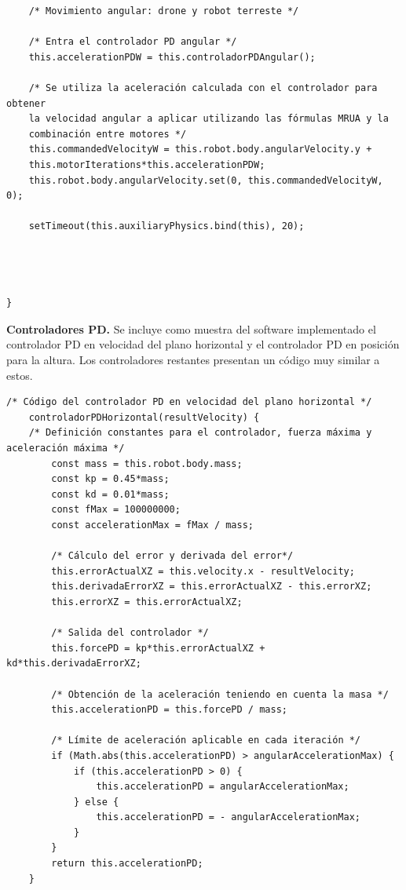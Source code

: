 {\begin{verbatim}
    /* Movimiento angular: drone y robot terreste */
    
    /* Entra el controlador PD angular */              
    this.accelerationPDW = this.controladorPDAngular();
    
    /* Se utiliza la aceleración calculada con el controlador para obtener 
    la velocidad angular a aplicar utilizando las fórmulas MRUA y la 
    combinación entre motores */
    this.commandedVelocityW = this.robot.body.angularVelocity.y + 
    this.motorIterations*this.accelerationPDW;
    this.robot.body.angularVelocity.set(0, this.commandedVelocityW, 0);
    
    setTimeout(this.auxiliaryPhysics.bind(this), 20);
    
    
    
    
}
\end{verbatim}
}
\normalsize
\textbf{Controladores PD.} Se incluye como muestra del software implementado el controlador PD en velocidad del plano horizontal y el controlador PD en posición para la altura. Los controladores restantes presentan un código muy similar a estos.

\footnotesize {
\begin{verbatim}
/* Código del controlador PD en velocidad del plano horizontal */
    controladorPDHorizontal(resultVelocity) {
    /* Definición constantes para el controlador, fuerza máxima y aceleración máxima */
        const mass = this.robot.body.mass;
        const kp = 0.45*mass;
        const kd = 0.01*mass;
        const fMax = 100000000;
        const accelerationMax = fMax / mass;

        /* Cálculo del error y derivada del error*/
        this.errorActualXZ = this.velocity.x - resultVelocity;
        this.derivadaErrorXZ = this.errorActualXZ - this.errorXZ;
        this.errorXZ = this.errorActualXZ;

        /* Salida del controlador */
        this.forcePD = kp*this.errorActualXZ + kd*this.derivadaErrorXZ;
        
        /* Obtención de la aceleración teniendo en cuenta la masa */
        this.accelerationPD = this.forcePD / mass;

        /* Límite de aceleración aplicable en cada iteración */
        if (Math.abs(this.accelerationPD) > angularAccelerationMax) {
            if (this.accelerationPD > 0) {
                this.accelerationPD = angularAccelerationMax;
            } else {
                this.accelerationPD = - angularAccelerationMax;
            }
        }
        return this.accelerationPD;
    }
\end{verbatim}
}

